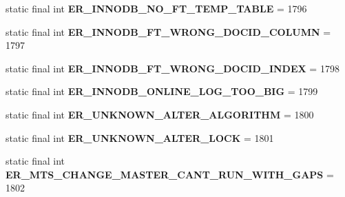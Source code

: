\begin{DoxyCompactItemize}
static final int {\bfseries E\+R\+\_\+\+I\+N\+N\+O\+D\+B\+\_\+\+N\+O\+\_\+\+F\+T\+\_\+\+T\+E\+M\+P\+\_\+\+T\+A\+B\+LE} = 1796
\item 
\mbox{\label{classcom_1_1mysql_1_1cj_1_1exceptions_1_1_mysql_error_numbers_ad1c59bf11cb378ed0feedc1d24952f58}} 
static final int {\bfseries E\+R\+\_\+\+I\+N\+N\+O\+D\+B\+\_\+\+F\+T\+\_\+\+W\+R\+O\+N\+G\+\_\+\+D\+O\+C\+I\+D\+\_\+\+C\+O\+L\+U\+MN} = 1797
\item 
\mbox{\label{classcom_1_1mysql_1_1cj_1_1exceptions_1_1_mysql_error_numbers_a91c7dc7eb96d8501350fcc771d8f5b69}} 
static final int {\bfseries E\+R\+\_\+\+I\+N\+N\+O\+D\+B\+\_\+\+F\+T\+\_\+\+W\+R\+O\+N\+G\+\_\+\+D\+O\+C\+I\+D\+\_\+\+I\+N\+D\+EX} = 1798
\item 
\mbox{\label{classcom_1_1mysql_1_1cj_1_1exceptions_1_1_mysql_error_numbers_a7a9d0902baa62ac98b5e31d8f83f7d0d}} 
static final int {\bfseries E\+R\+\_\+\+I\+N\+N\+O\+D\+B\+\_\+\+O\+N\+L\+I\+N\+E\+\_\+\+L\+O\+G\+\_\+\+T\+O\+O\+\_\+\+B\+IG} = 1799
\item 
\mbox{\label{classcom_1_1mysql_1_1cj_1_1exceptions_1_1_mysql_error_numbers_ac4e24ddca194ae284459965cce730df9}} 
static final int {\bfseries E\+R\+\_\+\+U\+N\+K\+N\+O\+W\+N\+\_\+\+A\+L\+T\+E\+R\+\_\+\+A\+L\+G\+O\+R\+I\+T\+HM} = 1800
\item 
\mbox{\label{classcom_1_1mysql_1_1cj_1_1exceptions_1_1_mysql_error_numbers_a09c92fc9d631b0023c588a0f69d3d89e}} 
static final int {\bfseries E\+R\+\_\+\+U\+N\+K\+N\+O\+W\+N\+\_\+\+A\+L\+T\+E\+R\+\_\+\+L\+O\+CK} = 1801
\item 
\mbox{\label{classcom_1_1mysql_1_1cj_1_1exceptions_1_1_mysql_error_numbers_a004b4231f001b39b256961bfcc636b8e}} 
static final int {\bfseries E\+R\+\_\+\+M\+T\+S\+\_\+\+C\+H\+A\+N\+G\+E\+\_\+\+M\+A\+S\+T\+E\+R\+\_\+\+C\+A\+N\+T\+\_\+\+R\+U\+N\+\_\+\+W\+I\+T\+H\+\_\+\+G\+A\+PS} = 1802
\item 
\mbox{\label{classcom_1_1mysql_1_1cj_1_1exceptions_1_1_mysql_error_numbers_a5ada68c28026e1e7d2f1335e98eb5800}} 

\end{DoxyCompactItemize}
